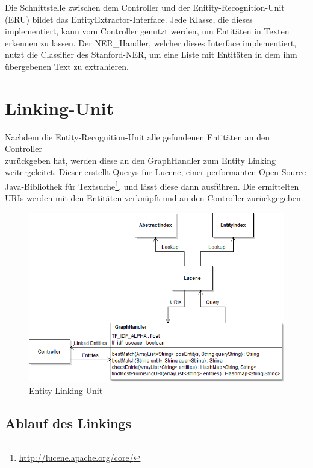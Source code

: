 \documentclass[11pt, a4paper, oneside]{Thesis} %
\begin{document}
Die Schnittstelle zwischen dem Controller und der Enitity-Recognition-Unit (ERU) bildet das EntityExtractor-Interface. Jede Klasse, die dieses implementiert, kann vom Controller genutzt werden, um Entit\"aten in Texten erkennen zu lassen. Der NER\_Handler, welcher dieses Interface implementiert, nutzt die Classifier des Stanford-NER, um eine Liste mit Entit\"aten in dem ihm \"ubergebenen Text zu extrahieren.

\section{Linking-Unit}
Nachdem die Entity-Recognition-Unit alle gefundenen Entit\"aten an den Controller\\ zurückgeben hat, werden diese an den GraphHandler zum Entity Linking weitergeleitet. Dieser erstellt Querys f\"ur Lucene, einer performanten Open Source Java-Bibliothek f\"ur Textsuche\footnote{\url{http://lucene.apache.org/core/}}, und l\"asst diese dann ausf\"uhren. Die ermittelten URIs werden mit den Entit\"aten verkn\"upft und an den Controller zur\"uckgegeben.
\begin{figure}[ht!]
\centering
\includegraphics[scale=0.55]{./entLinkImp.png}
\caption[Entity Linking Unit]{Entity Linking Unit}
\end{figure}

\subsection*{Ablauf des Linkings}
\end{document}
